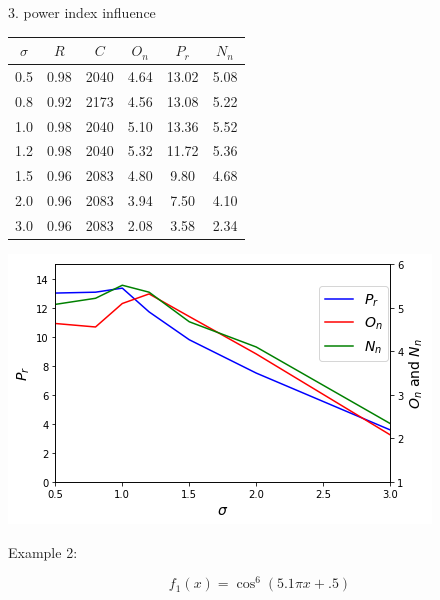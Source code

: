 \documentclass[smallextended]{svjour3}       %
\begin{document}
\begin{multicols}{2}
3. power index influence

\begin{tabular}{cccccc}
	\toprule
    $\sigma$ & $R$ & $C$ & $O_{n}$ & $P_{r}$ & $N_{n}$\\
	\midrule
    0.5 & 0.98 & 2040 & 4.64 & 13.02 & 5.08 \\
    0.8 & 0.92 & 2173 & 4.56 & 13.08 & 5.22 \\
    1.0 & 0.98 & 2040 & 5.10 & 13.36 & 5.52 \\
    1.2 & 0.98 & 2040 & 5.32 & 11.72 & 5.36 \\
    1.5 & 0.96 & 2083 & 4.80 & 9.80 & 4.68 \\
    2.0 & 0.96 & 2083 & 3.94 & 7.50 & 4.10 \\
    3.0 & 0.96 & 2083 & 2.08 & 3.58 & 2.34 \\
	\bottomrule
\end{tabular}

\begin{center}
  \includegraphics[width=\linewidth]{GA_images/sigma-parameter.png}
  \label{fig:sigma}
\end{center}

Example 2:


$$
f_{1}(x)=\cos^{6}(5.1 \pi x+.5)
$$



\end{multicols}
\end{document}
